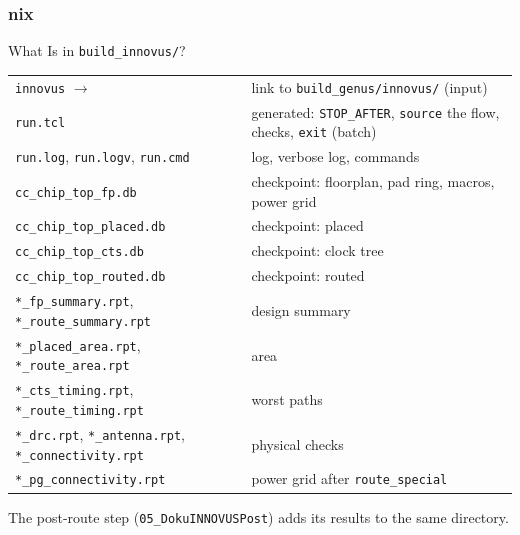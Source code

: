 \documentclass{beamer}
\newcommand{\astitle}{nix}
\newcommand{\assubtitle}{nix}
\newcommand{\cmd}[1]{\texttt{#1}}
\begin{document}
\renewcommand{\assubtitle}{What Is in \texttt{build\_innovus/}?}
\begin{frame}
\frametitle{\astitle}
\begin{block}{\assubtitle}
  \scriptsize
  \begin{tabularx}{\linewidth}{@{}lY@{}}
    \cmd{innovus} $\rightarrow$                & link to \cmd{build\_genus/innovus/} (input)\\[1pt]
    \cmd{run.tcl}                              & generated: \cmd{STOP\_AFTER}, \cmd{source} the flow,
                                                 checks, \cmd{exit} (batch)\\[1pt]
    \cmd{run.log}, \cmd{run.logv}, \cmd{run.cmd} & log, verbose log, commands\\[1pt]
    \cmd{cc\_chip\_top\_fp.db}                 & checkpoint: floorplan, pad ring,
                                                 macros, power grid\\[1pt]
    \cmd{cc\_chip\_top\_placed.db}             & checkpoint: placed\\[1pt]
    \cmd{cc\_chip\_top\_cts.db}                & checkpoint: clock tree\\[1pt]
    \cmd{cc\_chip\_top\_routed.db}             & checkpoint: routed\\[1pt]
    \cmd{*\_fp\_summary.rpt}, \cmd{*\_route\_summary.rpt} & design summary\\[1pt]
    \cmd{*\_placed\_area.rpt}, \cmd{*\_route\_area.rpt}   & area\\[1pt]
    \cmd{*\_cts\_timing.rpt}, \cmd{*\_route\_timing.rpt}  & worst paths\\[1pt]
    \cmd{*\_drc.rpt}, \cmd{*\_antenna.rpt}, \cmd{*\_connectivity.rpt} & physical checks\\[1pt]
    \cmd{*\_pg\_connectivity.rpt}             & power grid after \cmd{route\_special}\\
  \end{tabularx}
  \vspace{3pt}
  The post-route step (\cmd{05\_DokuINNOVUSPost}) adds its results to the
  same directory.
\end{block}
\end{frame}
\end{document}
